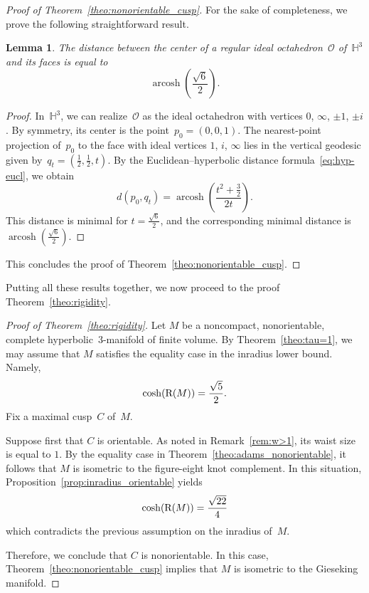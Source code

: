 \documentclass[11pt,reqno]{amsart}
\newtheorem{lemma}[theorem]{Lemma}
\theoremstyle{definition}
\numberwithin{equation}{section}
\newcommand{\HH}{{\mathbb H}}
\newcommand\RR{{\rm R}}
\DeclareMathOperator{\arcosh}{arcosh}
\numberwithin{equation}{section}
\begin{document}
\begin{proof}[Proof of Theorem~\ref{theo:nonorientable_cusp}]
For the sake of completeness, we prove the following straightforward result.

\begin{lemma} \label{lem:octahedron}
The distance between the center of a regular ideal octahedron~$\mathcal{O}$ of~$\HH^3$ and its faces is equal to
\[
\arcosh \left( \frac{\sqrt{6}}{2} \right).
\]
\end{lemma}

\begin{proof}
In~$\HH^3$, we can realize~$\mathcal{O}$ as the ideal octahedron with vertices $0$, $\infty$, $\pm 1$, $\pm i$.
By symmetry, its center is the point~$p_0=(0,0,1)$.
The nearest-point projection of~$p_0$ to the face with ideal vertices $1$, $i$, $\infty$ lies in the vertical geodesic given by~$q_t=(\frac{1}{2},\frac{1}{2},t)$.
By the Euclidean--hyperbolic distance formula~\eqref{eq:hyp-eucl}, we obtain
\[
d(p_0,q_t) = \arcosh \left( \frac{t^2+\frac{3}{2}}{2t} \right).
\]
This distance is minimal for $t=\frac{\sqrt{6}}{2}$, and the corresponding minimal distance is $\arcosh \left( \frac{\sqrt{6}}{2} \right)$.
\end{proof}
This concludes the proof of Theorem~\ref{theo:nonorientable_cusp}.
\end{proof}

Putting all these results together, we now proceed to the proof Theorem~\ref{theo:rigidity}.

\begin{proof}[Proof of Theorem~\ref{theo:rigidity}]
Let $M$ be a noncompact, nonorientable, complete hyperbolic~$3$-manifold of finite volume.
By Theorem~\ref{theo:tau=1}, we may assume that $M$ satisfies the equality case in the inradius lower bound.
Namely,
\[
\cosh(\RR(M)) = \frac{\sqrt{5}}{2}.
\]
Fix a maximal cusp~$C$ of~$M$.

Suppose first that $C$ is orientable. 
As noted in Remark~\ref{rem:w>1}, its waist size is equal to $1$.
By the equality case in Theorem~\ref{theo:adams_nonorientable}, it follows that $M$ is isometric to the figure-eight knot complement.
In this situation, Proposition~\ref{prop:inradius_orientable} yields
\[
\cosh(\RR(M)) = \frac{\sqrt{22}}{4}
\]
which contradicts the previous assumption on the inradius of~$M$.

Therefore, we conclude that $C$ is nonorientable.
In this case, Theorem~\ref{theo:nonorientable_cusp} implies that $M$ is isometric to the Gieseking manifold.
\end{proof}
\end{document}
